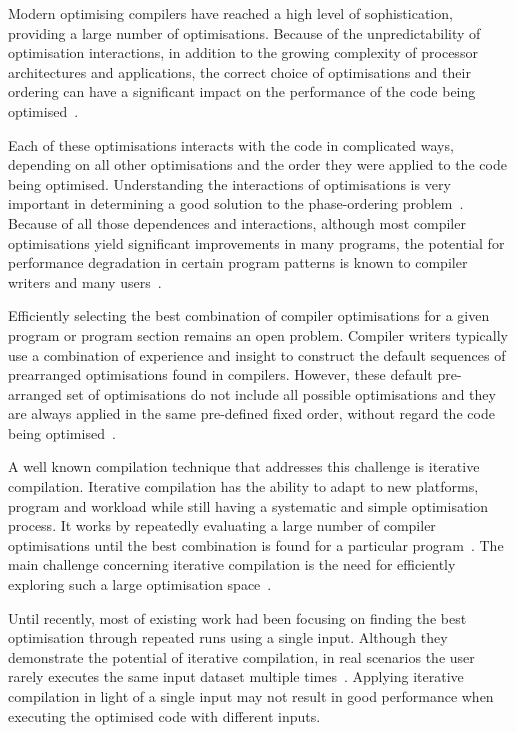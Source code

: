 \documentclass[sigplan,9pt]{acmart}
\newcommand{\itercomp}{{iterative compilation}}
\newcommand{\Itercomp}{{Iterative compilation}}
\begin{document}
Modern optimising compilers have reached a high level of sophistication, providing a large number of optimisations.
Because of the unpredictability of optimisation interactions, in addition to the growing complexity of processor architectures and applications, the correct choice of optimisations and their ordering can have a significant impact on the performance of the code being optimised~\cite{pan06,fursin07,kulkarni12}.

Each of these optimisations interacts with the code in complicated ways, depending on all other optimisations and the order they were applied to the code being optimised.
Understanding the interactions of optimisations is very important in determining a good solution to the phase-ordering problem~\cite{touati06,kulkarni12}.
Because of all those dependences and interactions, although most compiler optimisations yield significant improvements in many programs, the potential for performance degradation in certain program patterns is known to compiler writers and many users~\cite{pan06,zhou12,kulkarni12}.

Efficiently selecting the best combination of compiler optimisations for a given program or program section remains an open problem.
Compiler writers typically use a combination of experience and insight to construct the default sequences of prearranged optimisations found in compilers.
However, these default pre-arranged set of optimisations do not include all possible optimisations and they are always applied in the same pre-defined fixed order, without regard the code being optimised~\cite{pan06,cavazos07,zhou12,kulkarni12}.

A well known compilation technique that addresses this challenge is {\itercomp}.
{\Itercomp} has the ability to adapt to new platforms, program and workload while still having a systematic and simple optimisation process.
It works by repeatedly evaluating a large number of compiler optimisations until the best combination is found for a particular program~\cite{fursin07,chen10}.
The main challenge concerning {\itercomp} is the need for efficiently exploring such a large optimisation space~\cite{fursin07,cavazos07,zhou12}.

Until recently, most of existing work  had been focusing on finding the best optimisation through repeated runs using a single input.
Although they demonstrate the potential of {\itercomp}, in real scenarios the user rarely executes the same input dataset multiple times~\cite{bodin98,kisuki99,stephenson03,kulkarni04,agakov06}.
Applying {\itercomp} in light of a single input may not result in good performance when executing the optimised code with different inputs.
\end{document}
